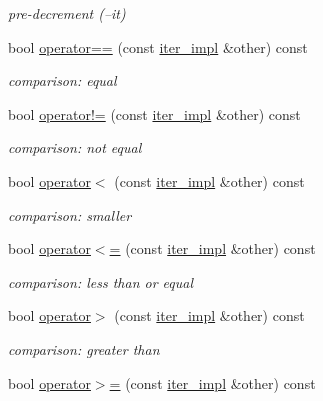 \begin{DoxyCompactItemize}
\begin{DoxyCompactList}\small\item\em pre-\/decrement (--it) \end{DoxyCompactList}\item 
bool \mbox{\hyperlink{classnlohmann_1_1basic__json_1_1iter__impl_af3beb0d08550188082ea64d8becd12fb}{operator==}} (const \mbox{\hyperlink{classnlohmann_1_1basic__json_1_1iter__impl}{iter\+\_\+impl}} \&other) const
\begin{DoxyCompactList}\small\item\em comparison\+: equal \end{DoxyCompactList}\item 
bool \mbox{\hyperlink{classnlohmann_1_1basic__json_1_1iter__impl_af6f10c91f59565b6c6e7205ab6969a89}{operator!=}} (const \mbox{\hyperlink{classnlohmann_1_1basic__json_1_1iter__impl}{iter\+\_\+impl}} \&other) const
\begin{DoxyCompactList}\small\item\em comparison\+: not equal \end{DoxyCompactList}\item 
bool \mbox{\hyperlink{classnlohmann_1_1basic__json_1_1iter__impl_a63c655881b0b7b7499a333ba77a7e4d1}{operator$<$}} (const \mbox{\hyperlink{classnlohmann_1_1basic__json_1_1iter__impl}{iter\+\_\+impl}} \&other) const
\begin{DoxyCompactList}\small\item\em comparison\+: smaller \end{DoxyCompactList}\item 
bool \mbox{\hyperlink{classnlohmann_1_1basic__json_1_1iter__impl_a5ed57d38f57f669f5788cea881772403}{operator$<$=}} (const \mbox{\hyperlink{classnlohmann_1_1basic__json_1_1iter__impl}{iter\+\_\+impl}} \&other) const
\begin{DoxyCompactList}\small\item\em comparison\+: less than or equal \end{DoxyCompactList}\item 
bool \mbox{\hyperlink{classnlohmann_1_1basic__json_1_1iter__impl_ae6c8e672ff064e0b92073b4dd939ada6}{operator$>$}} (const \mbox{\hyperlink{classnlohmann_1_1basic__json_1_1iter__impl}{iter\+\_\+impl}} \&other) const
\begin{DoxyCompactList}\small\item\em comparison\+: greater than \end{DoxyCompactList}\item 
bool \mbox{\hyperlink{classnlohmann_1_1basic__json_1_1iter__impl_a53a239bddcbd557f335d275c806535c1}{operator$>$=}} (const \mbox{\hyperlink{classnlohmann_1_1basic__json_1_1iter__impl}{iter\+\_\+impl}} \&other) const

\end{DoxyCompactItemize}
